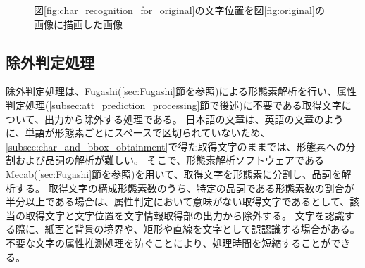 \begin{figure}[t]
    \begin{center}
        \caption{図\ref{fig:char_recognition_for_original}の文字位置を図\ref{fig:original}の画像に描画した画像}
        \label{fig:bbox_recognition_for_original}
    \end{center}
\end{figure}

\subsection{除外判定処理}\label{subsec:exclusion_judgement_processing}
除外判定処理は、Fugashi(\ref{sec:Fugashi}節を参照)による形態素解析を行い、属性判定処理(\ref{subsec:att_prediction_processing}節で後述)に不要である取得文字について、出力から除外する処理である。
日本語の文章は、英語の文章のように、単語が形態素ごとにスペースで区切られていないため、\ref{subsec:char_and_bbox_obtainment}で得た取得文字のままでは、形態素への分割および品詞の解析が難しい。
そこで、形態素解析ソフトウェアであるMecab(\ref{sec:Fugashi}節を参照)を用いて、取得文字を形態素に分割し、品詞を解析する。
取得文字の構成形態素数のうち、特定の品詞である形態素数の割合が半分以上である場合は、属性判定において意味がない取得文字であるとして、該当の取得文字と文字位置を文字情報取得部の出力から除外する。
文字を認識する際に、紙面と背景の境界や、矩形や直線を文字として誤認識する場合がある。
不要な文字の属性推測処理を防ぐことにより、処理時間を短縮することができる。

